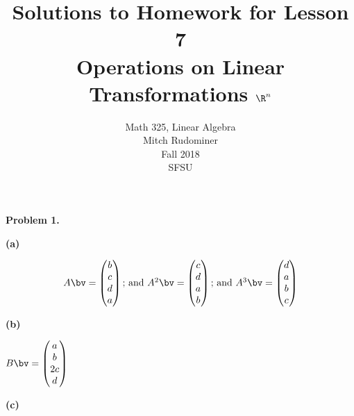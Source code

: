 \documentclass[oneside,12pt]{amsart}
\begin{document}
\title{Solutions to Homework for Lesson 7 \\ Operations on Linear Transformations $\R^n$}
\author{Math 325, Linear Algebra \\ Mitch Rudominer \\ Fall 2018 \\ SFSU }
\date{}

\maketitle

\textbf{Problem 1.}

\textbf{(a)}

$$
\begin{matrix}
A \bv =
\begin{pmatrix}
b \\
c \\
d \\
a \\
\end{pmatrix}
\text{; and }
A^2\bv =
\begin{pmatrix}
c \\
d \\
a \\
b \\
\end{pmatrix}
\text{; and }
A^3\bv =
\begin{pmatrix}
d \\
a \\
b \\
c \\
\end{pmatrix}
\end{matrix}
$$


\textbf{(b)}

$
B\bv =
\begin{pmatrix}
a \\
b \\
2c \\
d \\
\end{pmatrix}
$


\textbf{(c)}
\end{document}
